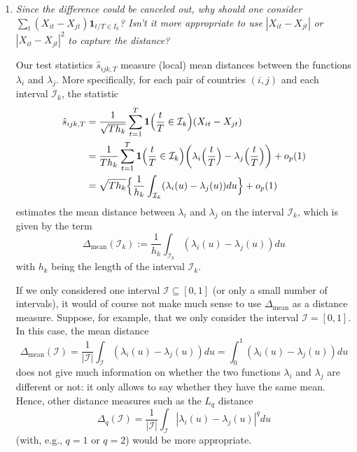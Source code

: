 \documentclass[a4paper,12pt]{article}
\begin{document}
\begin{enumerate}[label=(\arabic*),leftmargin=0.7cm]

\item \textit{Since the difference could be canceled out, why should one consider} $\sum\nolimits_t (X_{it} - X_{jt})\mathbf{1}_{t/T \in I_k}$\textit{? Isn't it more appropriate to use} $|X_{it} - X_{jt}|$ \textit{ or } $|X_{it} - X_{jt}|^2$ \textit{to capture the distance?}

Our test statistics $\hat{s}_{ijk,T}$ measure (local) mean distances between the functions $\lambda_i$ and $\lambda_j$. More specifically, for each pair of countries $(i,j)$ and each interval $\mathcal{I}_k$, the statistic
\begin{align*} 
\hat{s}_{ijk,T} 
 & = \frac{1}{\sqrt{Th_k}} \sum\limits_{t=1}^T \boldsymbol{1}\Big(\frac{t}{T} \in \mathcal{I}_k\Big) (X_{it} - X_{jt}) \\
 & = \frac{1}{Th_k} \sum\limits_{t=1}^T \boldsymbol{1}\Big(\frac{t}{T} \in \mathcal{I}_k\Big) \bigg( \lambda_i \Big(\frac{t}{T}\Big)  - \lambda_j \Big(\frac{t}{T}\Big)\bigg) + o_p(1) \\
 & = \sqrt{Th_k} \Big\{ \frac{1}{h_k} \int_{\mathcal{I}_k} (\lambda_i(u) - \lambda_j(u)) du \Big\} + o_p(1) 
\end{align*}
estimates the mean distance between $\lambda_i$ and $\lambda_j$ on the interval $\mathcal{I}_k$, which is given by the term 
\[ \Delta_{\text{mean}}(\mathcal{I}_k) := \frac{1}{h_k} \int_{\mathcal{I}_k} (\lambda_i(u) - \lambda_j(u)) du \]
with $h_k$ being the length of the interval $\mathcal{I}_k$. 

If we only considered one interval $\mathcal{I} \subseteq [0,1]$ (or only a small number of intervals), it would of course not make much sense to use $\Delta_{\text{mean}}$ as a distance measure. Suppose, for example, that we only consider the interval $\mathcal{I} = [0,1]$. In this case, the mean distance 
\[ \Delta_{\text{mean}}(\mathcal{I}) = \frac{1}{|\mathcal{I}|} \int_{\mathcal{I}} (\lambda_i(u) - \lambda_j(u)) du  = \int_0^1 (\lambda_i(u) - \lambda_j(u)) du \]
does not give much information on whether the two functions $\lambda_i$ and $\lambda_j$ are different or not: it only allows to say whether they have the same mean. Hence, other distance measures such as the $L_q$ distance  
\[ \Delta_q(\mathcal{I}) = \frac{1}{|\mathcal{I}|} \int_{\mathcal{I}} |\lambda_i(u) - \lambda_j(u)|^q du \]
(with, e.g., $q = 1$ or $q=2$) would be more appropriate.


\end{enumerate}
\end{document}
